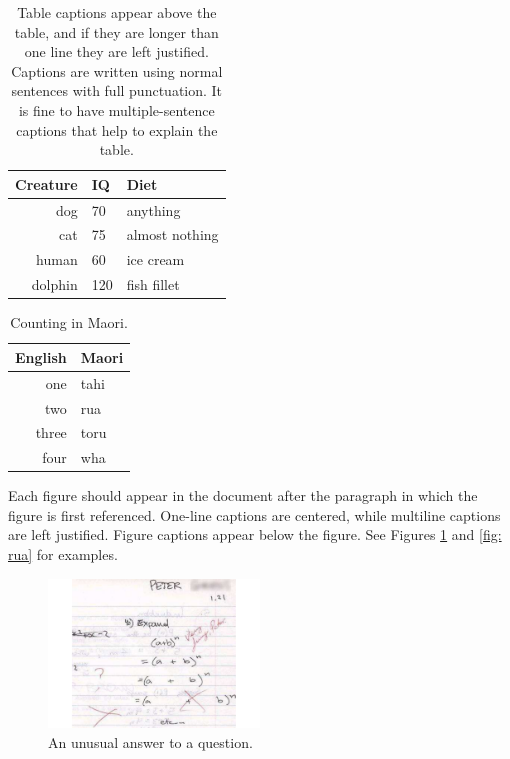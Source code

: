\documentclass{wscpaperproc}
\theoremstyle{wsc}
\begin{document}
\begin{table}[htb]
\centering
\caption{Table captions appear above the table, and if they are longer than one line they are left justified. Captions are written using normal sentences with full punctuation. It is fine to have multiple-sentence captions that help to explain the table.\label{tab: first}}
\begin{tabular}{rll}
\hline
Creature & IQ & Diet\\ \hline
dog & 70 & anything\\
cat & 75 & almost nothing\\
human & 60 & ice cream \\
dolphin & 120 & fish fillet\\
\hline
\end{tabular}
\end{table}

\begin{table}[htb]
\centering
\caption{Counting in Maori.\label{tab: second}}
\begin{tabular}{r|l}
English & Maori \\ \hline
one & tahi \\
two & rua \\
three & toru \\
four & wha \\
\end{tabular}
\end{table}

Each figure should appear in the document after the paragraph in which the figure is first referenced. One-line captions are centered,
while multiline captions are left justified. Figure captions appear below the figure. See Figures \ref{fig: tahi} and \ref{fig: rua} for examples.

\begin{figure}[htb]
{
\centering
\includegraphics[width=0.50\textwidth]{MathExpandExpression}
\caption{An unusual answer to a question.\label{fig: tahi}}
}
\end{figure}
\end{document}
